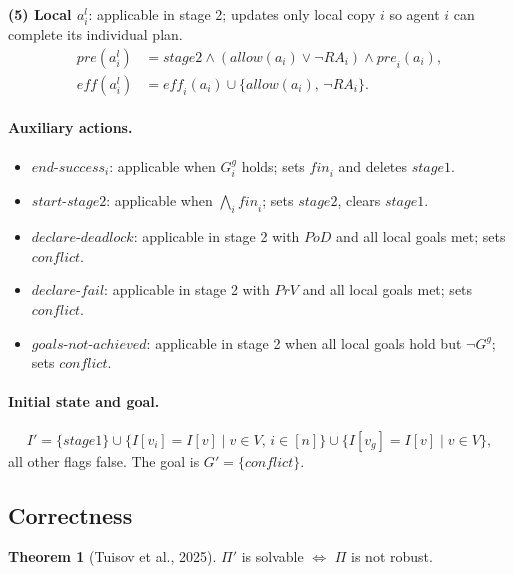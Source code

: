\documentclass{article}
\theoremstyle{definition}
\newtheorem{theorem}{Theorem}
\newcommand{\pre}{\mathit{pre}}
\newcommand{\eff}{\mathit{eff}}
\begin{document}
\medskip
\noindent\textbf{(5) Local $a_i^l$}: applicable in stage 2; updates only local copy $i$ so agent $i$ can complete its individual plan.
\begin{align*}
  \pre(a_i^l) &= \mathit{stage2} \wedge (\mathit{allow}(a_i) \vee \neg \mathit{RA}_i) \wedge \mathit{pre}_i(a_i), \\
  \eff(a_i^l) &= \eff_i(a_i) \cup \{\mathit{allow}(a_i),\, \neg\mathit{RA}_i\}.
\end{align*}

\paragraph{Auxiliary actions.}
\begin{itemize}
  \item $\mathit{end\text{-}success}_i$: applicable when $G_i^g$ holds; sets $\mathit{fin}_i$ and deletes $\mathit{stage1}$.
  \item $\mathit{start\text{-}stage2}$: applicable when $\bigwedge_i \mathit{fin}_i$; sets $\mathit{stage2}$, clears $\mathit{stage1}$.
  \item $\mathit{declare\text{-}deadlock}$: applicable in stage 2 with $\mathit{PoD}$ and all local goals met; sets $\mathit{conflict}$.
  \item $\mathit{declare\text{-}fail}$: applicable in stage 2 with $\mathit{PrV}$ and all local goals met; sets $\mathit{conflict}$.
  \item $\mathit{goals\text{-}not\text{-}achieved}$: applicable in stage 2 when all local goals hold but $\neg G^g$; sets $\mathit{conflict}$.
\end{itemize}

\paragraph{Initial state and goal.}
\[
  I' = \{\mathit{stage1}\} \cup \{I[v_i] = I[v] \mid v \in V,\, i \in [n]\} \cup \{I[v_g] = I[v] \mid v \in V\},
\]
all other flags false. The goal is $G' = \{\mathit{conflict}\}$.

\subsection{Correctness}

\begin{theorem}[Tuisov et al., 2025]
  $\Pi'$ is solvable $\Longleftrightarrow$ $\Pi$ is not robust.
\end{theorem}
\end{document}
